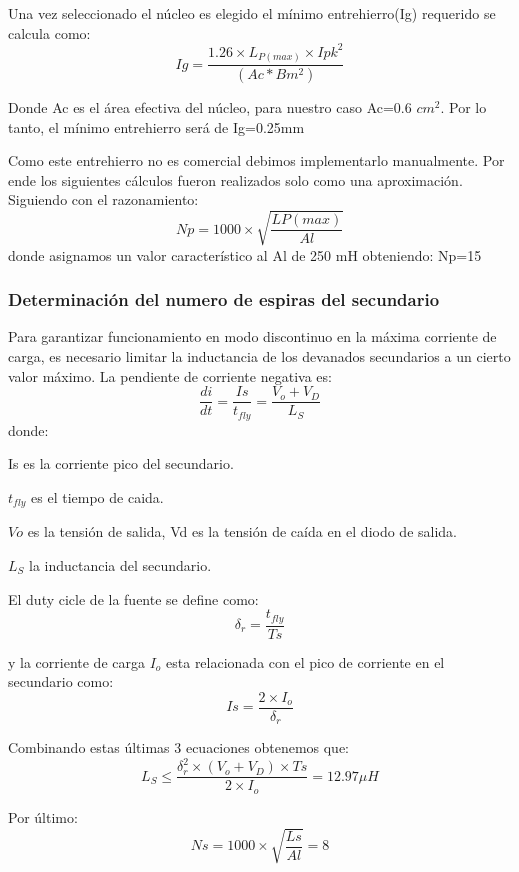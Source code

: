 Una vez seleccionado el núcleo es elegido el mínimo entrehierro(Ig) requerido se calcula como:
$$
Ig= \frac{1.26 \times L_{P(max)} \times Ipk^2}{(Ac*Bm^2)}
$$

Donde Ac es el área efectiva del núcleo, para nuestro caso Ac=0.6 $cm^2$. Por lo tanto, el mínimo entrehierro será de Ig=0.25mm

Como este entrehierro no es comercial debimos implementarlo manualmente. Por ende los siguientes cálculos fueron realizados solo como una aproximación.
Siguiendo con el razonamiento:
$$
Np= 1000 \times \sqrt{\frac{L{P(max)}}{Al}}
$$
donde asignamos un valor característico al Al de 250 mH obteniendo: Np=15
\medskip
\subsubsection{Determinación del numero de espiras del secundario}

Para garantizar funcionamiento en modo discontinuo en la máxima corriente de carga, es necesario limitar la inductancia de los devanados secundarios a un cierto valor máximo. La pendiente de corriente negativa es:
$$
\frac{di}{dt}= \frac{Is}{t_{fly}} = \frac{V_o+V_D}{L_S}
$$
donde:
\begin{list}{ }
\item  Is es la corriente pico del secundario.
\item $t_{fly}$ es el tiempo de caida. 
\item $Vo$ es la tensión de salida, Vd es la tensión de caída en el diodo de salida.
\item $L_S$ la inductancia del secundario.
\item
\end{list}

El duty cicle de la fuente se define como:
$$
\delta_r= \frac{t_{fly}}{Ts}
$$

y la corriente de carga $I_o$ esta relacionada con el pico de corriente en el secundario
como:
$$
Is=\frac{2 \times I_o }{\delta_r}
$$

Combinando estas últimas 3 ecuaciones obtenemos que:
$$
L_S \leq \frac{\delta_r^2 \times (V_o + V_D) \times Ts}{2 \times I_o} =12.97\mu H
$$

Por último:
$$
Ns= 1000 \times \sqrt{\frac{Ls}{Al}}=8
$$
\medskip
